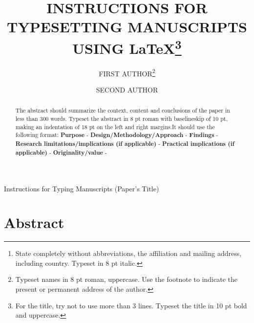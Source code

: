 \documentclass{IJCS_template}
\begin{document}
%
\catchline{}{}{}{}{}
%

{Instructions for Typing Manuscripts (Paper's Title)}

\title{INSTRUCTIONS FOR TYPESETTING MANUSCRIPTS \\
USING \LaTeX\footnote{For the title, try not
to use more than 3 lines. Typeset the title in 10 pt bold and uppercase.}
}

\author{FIRST AUTHOR\footnote{Typeset names in 8 pt roman,
uppercase. Use the footnote to indicate the
present or permanent address of the author.}}

\address{University Department, University Name, Address\\
City, State ZIP/Zone,Country\,\footnote{State completely
without abbreviations, the affiliation and mailing address, including
country. Typeset in 8 pt italic.}\\
  }

\author{SECOND AUTHOR}

\address{Group, Laboratory, Address\\
City, State ZIP/Zone, Country\\
author\_id@domain\_name
}

\maketitle

\begin{history}
\end{history}

\section*{Abstract}
\begin{abstract}
The abstract should summarize the context, content and conclusions
of the paper in less than 300 words. Typeset the abstract in 8 pt
roman with baselineskip of 10 pt, making an indentation of 18 pt on
the left and right margins.It should use the following format:
\newline\textbf{Purpose} - 
\newline\textbf{Design/Methodology/Approach} - 
\newline\textbf{Findings} - 
\newline\textbf{Research limitations/implications (if applicable)} - 
\newline\textbf{Practical implications (if applicable)} - 
\newline\textbf{Originality/value} - 
\end{abstract}
\end{document}
